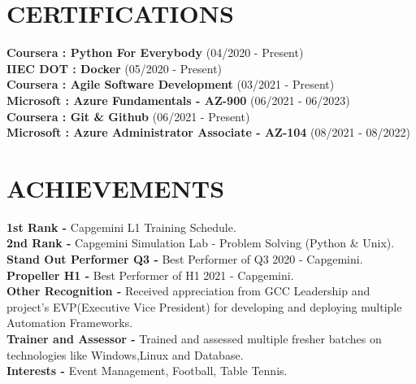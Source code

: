 \documentclass[letterpaper,11pt]{article}
\begin{document}
\section{CERTIFICATIONS}
 \begin{itemize}[leftmargin=0in, label={}]
    \small{\item{
    \textbf{Coursera : Python For Everybody} {(04/2020 - Present)}\vspace{2pt} \\
    \textbf{IIEC DOT : Docker} {(05/2020 - Present)}\vspace{2pt} \\
    \textbf{Coursera : Agile Software Development} {(03/2021 - Present)}\vspace{2pt} \\
    \textbf{Microsoft : Azure Fundamentals - AZ-900} {(06/2021 - 06/2023)}\vspace{2pt} \\
    \textbf{Coursera : Git \& Github} {(06/2021 - Present)}\vspace{2pt} \\
    \textbf{Microsoft : Azure Administrator Associate - AZ-104} {(08/2021 - 08/2022)}\vspace{2pt} \\
    }
    }
 \end{itemize}
 
\section{ACHIEVEMENTS}
 \begin{itemize}[leftmargin=0in, label={}]
    \small{\item{
    \textbf{1st Rank -} {Capgemini L1 Training Schedule.} \vspace{2pt} \\
    \textbf{2nd Rank -} {Capgemini Simulation Lab - Problem Solving (Python \& Unix).} \vspace{2pt} \\
    \textbf{Stand Out Performer Q3 -} {Best Performer of Q3 2020 - Capgemini.} \vspace{2pt} \\
    \textbf{Propeller H1 -} {Best Performer of H1 2021 - Capgemini.} \vspace{2pt} \\
    \textbf{Other Recognition -} {Received appreciation from GCC Leadership and project's EVP(Executive Vice President) for developing and deploying multiple Automation Frameworks.} \vspace{2pt} \\
    \textbf{Trainer and Assessor -} {Trained and assessed multiple fresher batches on technologies like Windows,Linux and Database.} \vspace{2pt} \\
    \textbf{Interests -} {Event Management, Football, Table Tennis.} \vspace{2pt} \\
    }
    }
 \end{itemize}
\end{document}
